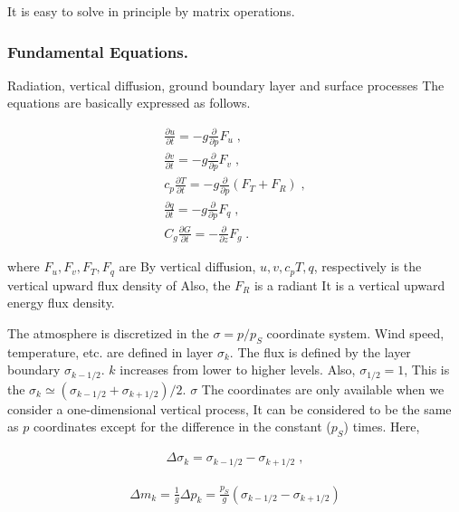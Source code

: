 It is easy to solve in principle by matrix operations.

\hypertarget{fundamental-equations.}{%
\subsubsection{Fundamental Equations.}\label{fundamental-equations.}}

Radiation, vertical diffusion, ground boundary layer and surface
processes The equations are basically expressed as follows.

\begin{eqnarray}
     \frac{\partial u}{\partial t}   =   - g \frac{\partial }{\partial p} F_u \; , \\
     \frac{\partial v}{\partial t}   =   - g \frac{\partial }{\partial p} F_v \; , \\
 c_p \frac{\partial T}{\partial t}   =   - g \frac{\partial }{\partial p} ( F_T + F_R ) \; , \\
     \frac{\partial q}{\partial t}   =   - g \frac{\partial }{\partial p} F_q \; , \\
 C_g \frac{\partial G}{\partial t}   =   -   \frac{\partial }{\partial z} F_g \; .
\end{eqnarray}

where \(F_u, F_v, F_T, F_q\) are By vertical diffusion,
\(u, v, c_p T, q\), respectively is the vertical upward flux density of
Also, the \(F_R\) is a radiant It is a vertical upward energy flux
density.

The atmosphere is discretized in the \(\sigma=p/p_S\) coordinate system.
Wind speed, temperature, etc. are defined in layer \(\sigma_k\). The
flux is defined by the layer boundary \(\sigma_{k-1/2}\). \(k\)
increases from lower to higher levels. Also, \(\sigma_{1/2} = 1\), This
is the \(\sigma_{k} \simeq (\sigma_{k-1/2} + \sigma_{k+1/2})/2\).
\(\sigma\) The coordinates are only available when we consider a
one-dimensional vertical process, It can be considered to be the same as
\(p\) coordinates except for the difference in the constant (\(p_S\))
times. Here,

\begin{eqnarray}
  \Delta \sigma_{k} = \sigma_{k-1/2} - \sigma_{k+1/2} \; , 
\end{eqnarray}

\begin{eqnarray}
  \Delta m_{k} = \frac{1}{g} \Delta p_k  
   = \frac{p_S}{g} ( \sigma_{k-1/2} - \sigma_{k+1/2} )
\end{eqnarray}


